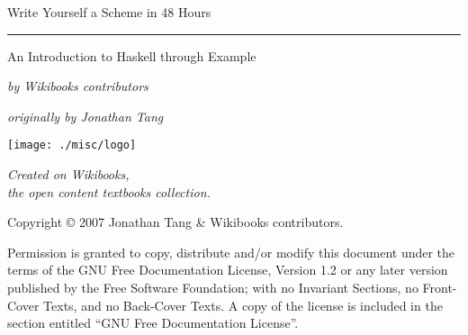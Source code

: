 \begin{titlepage}
	\begin{minipage}{365pt}
		\begin{center}
			\begin{Huge}Write Yourself a Scheme in 48 Hours\end{Huge}
 
			\rule[5pt]{365pt}{0.5mm}
 
			\begin{LARGE}An Introduction to Haskell through Example\end{LARGE}
 
			\bigskip
			\begin{large}\textit{by Wikibooks contributors}\end{large}
 
			\bigskip
			\begin{large}\textit{originally by Jonathan Tang}\end{large}
		\end{center}
 
		\addvspace{340pt}
 
		\begin{minipage}{0.4\textwidth}
			\begin{flushleft}
				\texttt{[image: ./misc/logo]}
			\end{flushleft}
		\end{minipage}
		\begin{minipage}{0.6\textwidth}
			\begin{flushleft}
			\textit{{\large Created on Wikibooks,}\\
				{\large the open content textbooks collection.}}
			\end{flushleft}
		\end{minipage}
	\end{minipage}
\end{titlepage}
 
\thispagestyle{empty}
\indent
\vfill
 
\noindent
Copyright \copyright{}  2007  Jonathan Tang \& Wikibooks contributors.
 
\bigskip
\noindent
Permission is granted to copy, distribute and/or modify this document under the terms of the GNU Free Documentation License, Version 1.2 or any later version published by the Free Software Foundation; with no Invariant Sections, no Front-Cover Texts, and no Back-Cover Texts. A copy of the license is included in the section entitled ``GNU Free Documentation License''.
